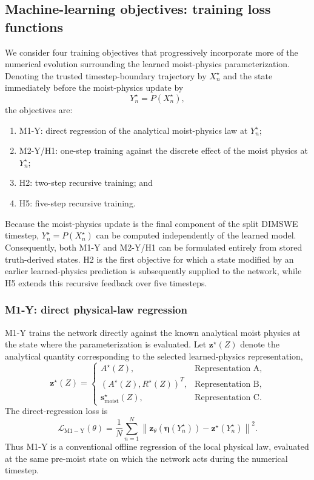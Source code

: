 \documentclass[12pt]{article}
\begin{document}
\subsection{Machine-learning objectives: training loss functions}

We consider four training objectives that progressively incorporate more of the
numerical evolution surrounding the learned moist-physics parameterization.
Denoting the trusted timestep-boundary trajectory by $X_n^\star$ and the state
immediately before the moist-physics update by
\begin{equation}
	Y_n^\star=P(X_n^\star),
\end{equation}
the objectives are:
\begin{enumerate}
	\item M1-Y: direct regression of the analytical moist-physics law at
	$Y_n^\star$;
	\item M2-Y/H1: one-step training against the discrete effect of the moist
	physics at $Y_n^\star$;
	\item H2: two-step recursive training; and
	\item H5: five-step recursive training.
\end{enumerate}

Because the moist-physics update is the final component of the split DIMSWE
timestep, $Y_n^\star=P(X_n^\star)$ can be computed independently of the
learned model. Consequently, both M1-Y and M2-Y/H1 can be formulated entirely
from stored truth-derived states. H2 is the first objective for which a state
modified by an earlier learned-physics prediction is subsequently supplied to
the network, while H5 extends this recursive feedback over five timesteps.


\subsubsection{M1-Y: direct physical-law regression}

M1-Y trains the network directly against the known analytical moist physics at
the state where the parameterization is evaluated. Let
$\mathbf{z}^\star(Z)$ denote the analytical quantity corresponding to the
selected learned-physics representation,
\begin{equation}
	\mathbf{z}^\star(Z)
	=
	\begin{cases}
		A^\star(Z),
		& \text{Representation A},\\[1mm]
		\left(A^\star(Z),R^\star(Z)\right)^T,
		& \text{Representation B},\\[1mm]
		\mathbf{s}_{\mathrm{moist}}^\star(Z),
		& \text{Representation C}.
	\end{cases}
\end{equation}
The direct-regression loss is
\begin{equation}
	\mathcal{L}_{\mathrm{M1-Y}}(\theta)
	=
	\frac{1}{N}
	\sum_{n=1}^{N}
	\left\|
	\mathbf{z}_\theta
	\!\left(\boldsymbol{\eta}(Y_n^\star)\right)
	-
	\mathbf{z}^\star(Y_n^\star)
	\right\|^2.
	\label{eq:M1Y_loss}
\end{equation}
Thus M1-Y is a conventional offline regression of the local physical law,
evaluated at the same pre-moist state on which the network acts during the
numerical timestep.
\end{document}
